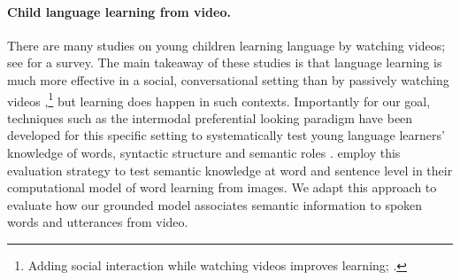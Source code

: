 \paragraph{Child language learning from video.}
There are many studies on young children learning language by watching
videos; see \cite{vanderplank2010deja} for a survey. The main takeaway
of these studies is that language learning is much more effective in a
social, conversational setting than by passively watching videos
\cite{kuhl2003foreign,anderson2005television,robb2009just},\footnote{Adding
social interaction while watching videos improves learning;
\citet{lytle2018two}.} but learning does happen in such
contexts. Importantly for our goal, techniques such as the intermodal
preferential looking paradigm have been developed for this specific
setting to systematically test young language learners' knowledge of
words, syntactic structure and semantic roles
\cite{hirsh1996intermodal,bergelson20126,noble2011comprehension}.
\citet{nikolaus-fourtassi-2021-evaluating}
employ this evaluation strategy to test semantic knowledge at word and
sentence level in their computational model of word learning from
images. We adapt this approach to evaluate how our grounded model
associates semantic information to spoken words and utterances from
video.
 
 




